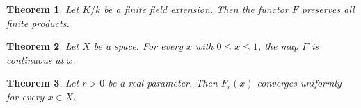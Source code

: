 \documentclass{article}
\newtheorem{theorem}{Theorem}
\begin{document}
\begin{theorem}Let $K/k$ be a finite field extension. Then the functor $F$ preserves all finite products.\end{theorem}
\begin{theorem}Let $X$ be a space. For every $x$ with $0\leq x\leq1$, the map $F$ is continuous at $x$.\end{theorem}
\begin{theorem}Let $r>0$ be a real parameter. Then $F_r(x)$ converges uniformly for every $x\in X$.\end{theorem}
\end{document}
